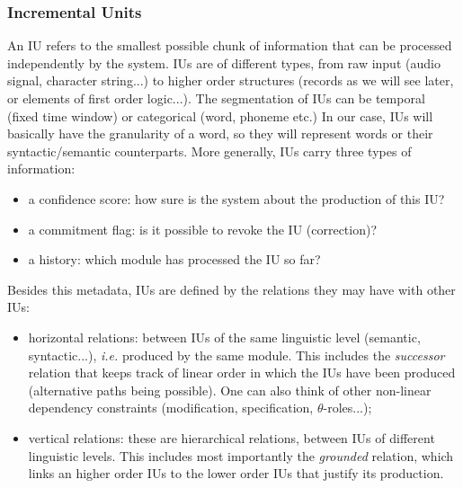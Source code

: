 \documentclass[11pt]{article}
\begin{document}
			\subsubsection{Incremental Units}
				An IU refers to the smallest possible chunk of information that can be processed independently by the system. IUs are of different types, from raw input (audio signal, character string...) to higher order structures (records as we will see later, or elements of first order logic...). The segmentation of IUs can be temporal (fixed time window) or categorical (word, phoneme etc.) In our case, IUs will basically have the granularity of a word, so they will represent words or their syntactic/semantic counterparts. More generally, IUs carry three types of information:
				\begin{itemize}
					\item a confidence score: how sure is the system about the production of this IU?\vspace{-2mm}
					\item a commitment flag: is it possible to revoke the IU (correction)?\vspace{-2mm}
					\item a history: which module has processed the IU so far?
				\end{itemize}
				Besides this metadata, IUs are defined by the relations they may have with other IUs:
				\begin{itemize}
					\item horizontal relations: between IUs of the same linguistic level (semantic, syntactic...), \textit{i.e.} produced by the same module. This includes the \textit{successor} relation that keeps track of linear order in which the IUs have been produced (alternative paths being possible). One can also think of other non-linear dependency constraints (modification, specification, $\theta$-roles...); \vspace{-2mm}
					\item vertical relations: these are hierarchical relations, between IUs of different linguistic levels. This includes most importantly the \textit{grounded} relation, which links an higher order IUs to the lower order IUs that justify its production.
				\end{itemize}
\end{document}
